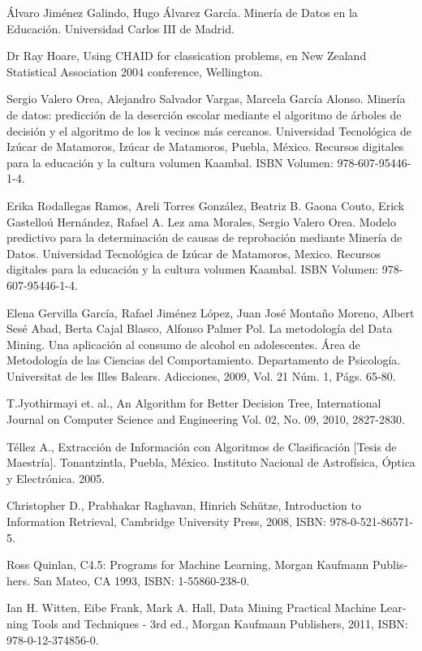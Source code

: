 \begin{thebibliography}{Referencias}
Álvaro Jiménez Galindo, Hugo Álvarez García. Minería
de Datos en la Educación. Universidad Carlos III de Madrid.

Dr Ray Hoare, Using CHAID for classication problems,
en New Zealand Statistical Association 2004 conference, Wellington.

Sergio Valero Orea, Alejandro Salvador Vargas, Marcela
García Alonso. Minería de datos: predicción de la deserción escolar
mediante el algoritmo de árboles de decisión y el algoritmo de los
k vecinos más cercanos. Universidad Tecnológica de Izúcar de Matamoros,
Izúcar de Matamoros, Puebla, México. Recursos digitales para la educación
y la cultura volumen Kaambal. ISBN Volumen: 978-607-95446-1-4.

Erika Rodallegas Ramos, Areli Torres González, Beatriz
B. Gaona Couto, Erick Gastelloú Hernández, Rafael A. Lez ama Morales,
Sergio Valero Orea. Modelo predictivo para la determinación de causas
de reprobación mediante Minería de Datos. Universidad Tecnológica
de Izúcar de Matamoros, Mexico. Recursos digitales para la educación
y la cultura volumen Kaambal. ISBN Volumen: 978-607-95446-1-4.

Elena Gervilla García, Rafael Jiménez López, Juan
José Montaño Moreno, Albert Sesé Abad, Berta Cajal Blasco, Alfonso
Palmer Pol. La metodología del Data Mining. Una aplicación al consumo
de alcohol en adolescentes. Área de Metodología de las Ciencias del
Comportamiento. Departamento de Psicología. Universitat de les Illes
Balears. Adicciones, 2009, Vol. 21 Núm. 1, Págs. 65-80.

T.Jyothirmayi et. al., An Algorithm for Better Decision
Tree, International Journal on Computer Science and Engineering Vol.
02, No. 09, 2010, 2827-2830.

Téllez A., Extracción de Información con Algoritmos
de Clasificación {[}Tesis de Maestría{]}. Tonantzintla, Puebla, México.
Instituto Nacional de Astrofísica, Óptica y Electrónica. 2005.

Christopher D., Prabhakar Raghavan, Hinrich Schütze, Introduction to Information Retrieval, Cambridge University Press, 2008, ISBN: 978-0-521-86571-5.

\foreignlanguage{spanish}{Ross Quinlan, C4.5: Programs for Machine Learning, Morgan Kaufmann Publishers. San Mateo, CA 1993, ISBN: 1-55860-238-0.}

\foreignlanguage{spanish}{Ian H. Witten, Eibe Frank, Mark A. Hall, Data Mining
Practical Machine Learning
Tools and Techniques - 3rd ed., Morgan Kaufmann Publishers, 2011, ISBN: 978-0-12-374856-0.}


\end{thebibliography}
